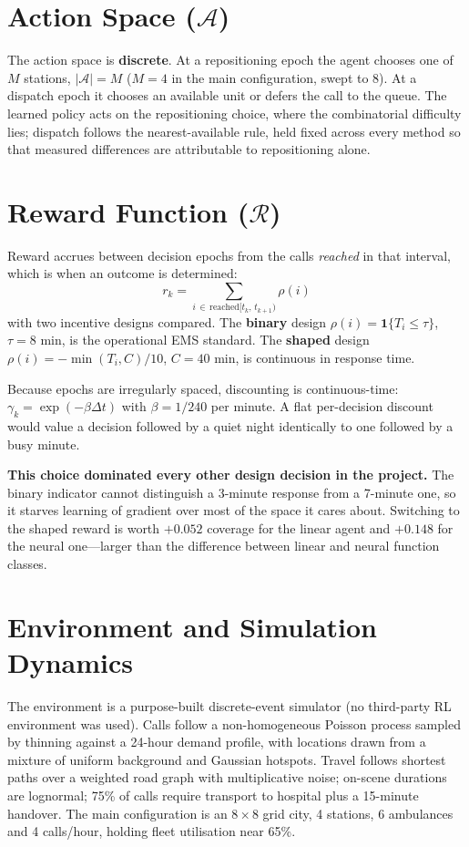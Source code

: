 \documentclass[10pt,twocolumn,a4paper]{article}
\begin{document}
\section{Action Space ($\mathcal{A}$)}
The action space is \textbf{discrete}. At a repositioning epoch the agent chooses one of
$M$ stations, $|\mathcal{A}| = M$ ($M = 4$ in the main configuration, swept to 8). At a
dispatch epoch it chooses an available unit or defers the call to the queue. The learned
policy acts on the repositioning choice, where the combinatorial difficulty lies; dispatch
follows the nearest-available rule, held fixed across every method so that measured
differences are attributable to repositioning alone.

\section{Reward Function ($\mathcal{R}$)}
Reward accrues between decision epochs from the calls \emph{reached} in that interval,
which is when an outcome is determined:
\begin{equation*}
r_k = \sum_{i \,\in\, \text{reached}[t_k,\, t_{k+1})} \rho(i)
\end{equation*}
with two incentive designs compared. The \textbf{binary} design $\rho(i) =
\mathbf{1}\{T_i \le \tau\}$, $\tau = 8$ min, is the operational EMS standard. The
\textbf{shaped} design $\rho(i) = -\min(T_i, C)/10$, $C = 40$ min, is continuous in
response time.

Because epochs are irregularly spaced, discounting is continuous-time: $\gamma_k =
\exp(-\beta \Delta t)$ with $\beta = 1/240$ per minute. A flat per-decision discount would
value a decision followed by a quiet night identically to one followed by a busy minute.

\textbf{This choice dominated every other design decision in the project.} The binary
indicator cannot distinguish a 3-minute response from a 7-minute one, so it starves
learning of gradient over most of the space it cares about. Switching to the shaped reward
is worth $+0.052$ coverage for the linear agent and $+0.148$ for the neural one---larger
than the difference between linear and neural function classes.

\section{Environment and Simulation Dynamics}
The environment is a purpose-built discrete-event simulator (no third-party RL environment
was used). Calls follow a non-homogeneous Poisson process sampled by thinning against a
24-hour demand profile, with locations drawn from a mixture of uniform background and
Gaussian hotspots. Travel follows shortest paths over a weighted road graph with
multiplicative noise; on-scene durations are lognormal; 75\% of calls require transport to
hospital plus a 15-minute handover. The main configuration is an $8 \times 8$ grid city, 4
stations, 6 ambulances and 4 calls/hour, holding fleet utilisation near 65\%.
\end{document}
